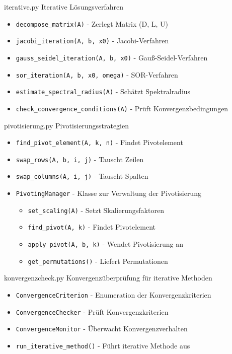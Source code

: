\begin{KR}{iterative.py}
    Iterative Lösungsverfahren
    \begin{itemize}
        \item \texttt{decompose\_matrix(A)} - Zerlegt Matrix (D, L, U)
        \item \texttt{jacobi\_iteration(A, b, x0)} - Jacobi-Verfahren
        \item \texttt{gauss\_seidel\_iteration(A, b, x0)} - Gauß-Seidel-Verfahren
        \item \texttt{sor\_iteration(A, b, x0, omega)} - SOR-Verfahren
        \item \texttt{estimate\_spectral\_radius(A)} - Schätzt Spektralradius
        \item \texttt{check\_convergence\_conditions(A)} - Prüft Konvergenzbedingungen
    \end{itemize}
\end{KR}

\begin{KR}{pivotisierung.py}
    Pivotisierungsstrategien
    \begin{itemize}
        \item \texttt{find\_pivot\_element(A, k, n)} - Findet Pivotelement 
        \item \texttt{swap\_rows(A, b, i, j)} - Tauscht Zeilen
        \item \texttt{swap\_columns(A, i, j)} - Tauscht Spalten
        \item \texttt{PivotingManager} - Klasse zur Verwaltung der Pivotisierung
            \begin{itemize}
                \item \texttt{set\_scaling(A)} - Setzt Skalierungsfaktoren
                \item \texttt{find\_pivot(A, k)} - Findet Pivotelement
                \item \texttt{apply\_pivot(A, b, k)} - Wendet Pivotisierung an
                \item \texttt{get\_permutations()} - Liefert Permutationen
            \end{itemize}
    \end{itemize}
\end{KR}

\begin{KR}{konvergenzcheck.py}
    Konvergenzüberprüfung für iterative Methoden
    \begin{itemize}
        \item \texttt{ConvergenceCriterion} - Enumeration der Konvergenzkriterien
        \item \texttt{ConvergenceChecker} - Prüft Konvergenzkriterien
        \item \texttt{ConvergenceMonitor} - Überwacht Konvergenzverhalten
        \item \texttt{run\_iterative\_method()} - Führt iterative Methode aus
    \end{itemize}
\end{KR}

